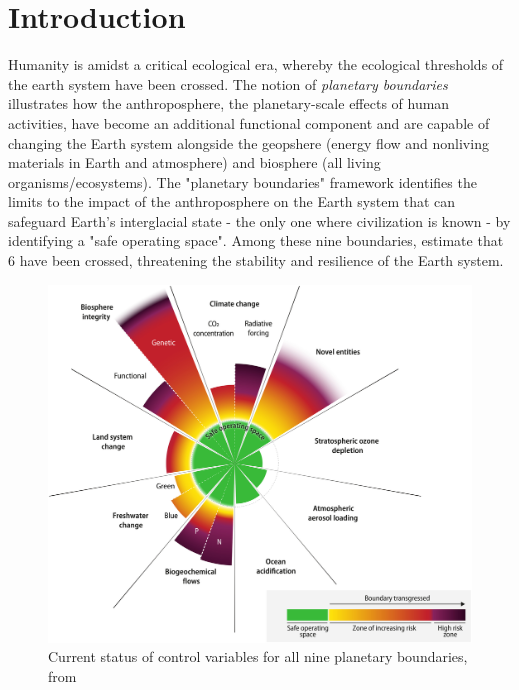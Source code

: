 \chapter{Introduction}

Humanity is amidst a critical ecological era, whereby the ecological thresholds of the earth system have been crossed. The notion of \textit{planetary boundaries} \citep{rockstrom2009safe,steffen_2015_planetary} illustrates how the anthroposphere, the planetary-scale effects of human activities, have become an additional functional component and are capable of changing the Earth system \citep{richardson_earth_2023} alongside the geopshere (energy flow and nonliving materials in Earth and atmosphere) and biosphere (all living organisms/ecosystems). The "planetary boundaries" framework identifies the limits to the impact of the anthroposphere on the Earth system that can safeguard Earth's interglacial state - the only one where civilization is known - by identifying a "safe operating space". Among these nine boundaries, \cite{richardson_earth_2023} estimate that 6 have been crossed, threatening the stability and resilience of the Earth system. 

\begin{figure}[h]
	\centering
	\includegraphics[width= .7\textwidth]{figures/intro/planetary_bounds.jpg}
	\caption{Current status of control variables for all nine planetary boundaries, from \cite{richardson_earth_2023}}
\end{figure}


